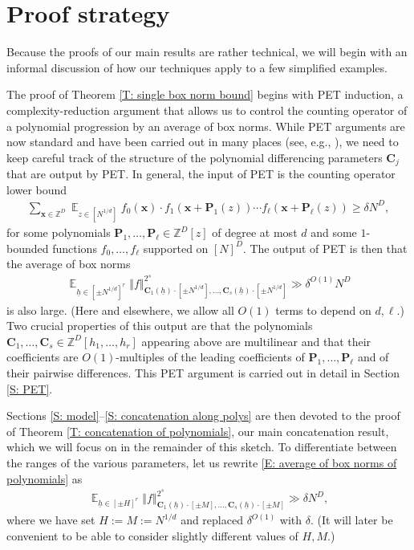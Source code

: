 \documentclass[11pt]{amsart}
\theoremstyle{definition}
\DeclareMathOperator*{\E}{\mathbb{E}}
\newcommand{\Z}{{\mathbb Z}}
\newcommand{\bc}{{\mathbf{C}}}
\newcommand{\p}{{\mathbf{P}}}
\newcommand{\bx}{{\mathbf{x}}}
\newcommand{\uh}{{\underline{h}}}
\newcommand{\norm}[1]{\left\Vert #1\right\Vert}
\begin{document}
\section{Proof strategy}\label{S: strategy}
Because the proofs of our main results are rather technical, we will begin with an informal discussion of how our techniques apply to a few simplified examples.

The proof of Theorem \ref{T: single box norm bound} begins with PET induction, a complexity-reduction argument that allows us to control the counting operator of a polynomial progression by an average of box norms.  While PET arguments are now standard and have been carried out in many places (see, e.g., \cite{Ber87, BL96, DFKS22, Pel20, Pre17}), we need to keep careful track of the structure of the polynomial differencing parameters $\bc_j$ that are output by PET.  In general, the input of PET is the counting operator lower bound
\begin{align*}
    {\sum_{\bx\in\Z^D}\E_{z\in[N^{1/d}]} f_0(\bx)\cdot f_1(\bx+\p_1(z))\cdots f_\ell(\bx+\p_\ell(z))} \geq \delta N^D,
\end{align*}
for some polynomials $\p_1, \ldots, \p_\ell\in\Z^D[z]$ of degree at most $d$ and some $1$-bounded functions $f_0, \ldots, f_\ell$ supported on $[N]^D$.  The output of PET is then that the average of box norms 
\begin{align}\label{E: average of box norms of polynomials}
	 \E_{\uh\in[\pm N^{1/d}]^{r}}\norm{f}_{{\bc_1(\uh)\cdot[\pm N^{1/d}]}, \ldots, {\bc_s(\uh)\cdot[\pm N^{1/d}]}}^{2^s} \gg \delta^{O(1)} N^D
\end{align}
is also large. (Here and elsewhere, we allow all $O(1)$ terms to depend on $d,\ell$.)  Two crucial properties of this output are that the polynomials $\bc_1, \ldots, \bc_s\in\Z^D[h_1, \ldots, h_r]$ appearing above are multilinear and that their coefficients are $O(1)$-multiples of the leading coefficients of $\p_1, \ldots, \p_\ell$ and of their pairwise differences.  This PET argument is carried out in detail in Section \ref{S: PET}.

Sections \ref{S: model}--\ref{S: concatenation along polys} are then devoted to the proof of Theorem \ref{T: concatenation of polynomials}, our main concatenation result, which we will focus on in the remainder of this sketch.  To differentiate between the ranges of the various parameters, let us rewrite \eqref{E: average of box norms of polynomials} as
\begin{align}\label{E: PET output}
    \E_{\uh\in[\pm H]^{r}}\norm{f}_{{\bc_1(\uh)\cdot[\pm M]}, \ldots, {\bc_s(\uh)\cdot[\pm M]}}^{2^s} \gg \delta N^D,
\end{align}
where we have set $H:=M:=N^{1/d}$ and replaced $\delta^{O(1)}$ with $\delta$.  (It will later be convenient to be able to consider slightly different values of $H,M$.)
\end{document}
